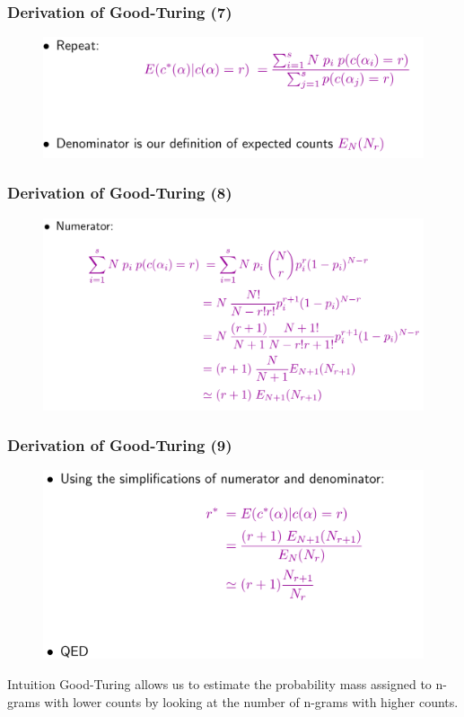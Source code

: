 \documentclass{beamer}
\begin{document}
\begin{frame}\frametitle{Derivation of Good-Turing (7)}
\begin{figure}
\includegraphics[width=0.9\linewidth]{figure/derivation_good_turing_7.pdf}
\end{figure}
\end{frame}


\begin{frame}\frametitle{Derivation of Good-Turing (8)}
\begin{figure}
\includegraphics[width=0.9\linewidth]{figure/derivation_good_turing_8.pdf}
\end{figure}
\end{frame}


\begin{frame}\frametitle{Derivation of Good-Turing (9)}
\begin{figure}
\includegraphics[width=0.8\linewidth]{figure/derivation_good_turing_9.pdf}
\end{figure}

\begin{block}{Intuition}
Good-Turing allows us to estimate the probability mass assigned to n-grams with lower counts by
looking at the number of n-grams with higher counts.  
\end{block}

\end{frame}
\end{document}
